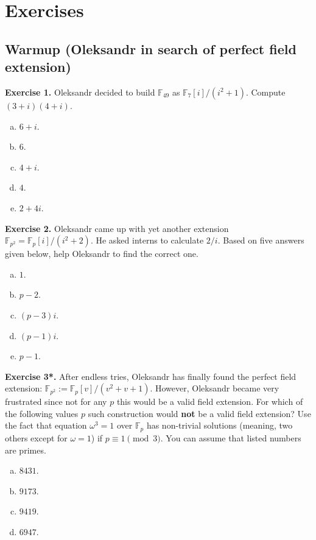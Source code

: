 \documentclass[../lecture-notes.tex]{subfiles}
\begin{document}
\section{Exercises}
\subsection*{Warmup (Oleksandr in search of perfect field extension)}

\textbf{Exercise 1.} Oleksandr decided to build $\mathbb{F}_{49}$ as $\mathbb{F}_7[i]/(i^2+1)$. Compute $(3+i)(4+i)$. 

\begin{enumerate}[a)]
    \item $6+i$.
    \item $6$.
    \item $4+i$.
    \item $4$.
    \item $2+4i$.
\end{enumerate}

\textbf{Exercise 2.} Oleksandr came up with yet another extension $\mathbb{F}_{p^2} = \mathbb{F}_p[i]/(i^2+2)$. He asked interns to calculate $2/i$. Based on five answers given below, help Oleksandr to find the correct one.
\begin{enumerate}[a)]
    \item $1$.
    \item $p-2$.
    \item $(p-3)i$.
    \item $(p-1)i$.
    \item $p-1$.
\end{enumerate}

\textbf{Exercise 3*.} After endless tries, Oleksandr has finally found the perfect field extension: $\mathbb{F}_{p^2} := \mathbb{F}_p[v] / (v^2+v+1)$. However, Oleksandr became very frustrated since not for any $p$ this would be a valid field extension. For which of the following values $p$ such construction would \textbf{not} be a valid field extension? Use the fact that equation $\omega^3=1$ over $\mathbb{F}_p$ has non-trivial solutions (meaning, two others except for $\omega=1$) if $p \equiv 1 \pmod{3}$. You can assume that listed numbers are primes.
\begin{enumerate}[a)]
    \item $8431$.
    \item $9173$.
    \item $9419$.
    \item $6947$.
\end{enumerate}
\end{document}

